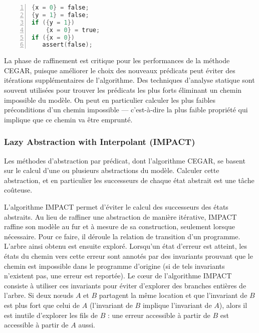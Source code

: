 \begin{minipage}{.45\textwidth}
\begin{lstlisting}[language=C, label=lst:CEGAR_3, numbers=left, frame=single,
  caption=Second raffinement, xleftmargin=1.6em]
{x = 0} = false;
{y = 1} = false;
if ({y = 1})
    {x = 0} = true;
if ({x = 0})
   assert(false);
\end{lstlisting}
\end{minipage}

La phase de raffinement est critique pour les performances de la méthode
\ac{CEGAR}, puisque améliorer le choix des nouveaux prédicats peut éviter des
itérations supplémentaires de l'algorithme. Des techniques d'analyse statique
sont souvent utilisées pour trouver les prédicats les plus forts éliminant un
chemin impossible du modèle. On peut en particulier calculer les plus faibles
préconditions d'un chemin impossible --- c'est-à-dire la plus faible propriété
qui implique que ce chemin va être emprunté.

\subsubsection{Lazy Abstraction with Interpolant (IMPACT)}

Les méthodes d'abstraction par prédicat, dont l'algorithme \ac{CEGAR}, se basent sur
le calcul d'une ou plusieurs abstractions du modèle. Calculer cette abstraction,
et en particulier les successeurs de chaque état abstrait est une tâche
coûteuse.

L'algorithme IMPACT\cite{IMPACT} permet d'éviter le calcul des successeurs des
états abstraits. Au lieu de raffiner une abstraction de manière itérative,
IMPACT raffine son modèle au fur et à mesure de sa construction, seulement
lorsque nécessaire. Pour ce faire, il déroule la relation de transition d'un
programme. L'arbre ainsi obtenu est ensuite exploré. Lorsqu'un état d'erreur
est atteint, les états du chemin vers cette erreur sont annotés par des invariants
prouvant que le chemin est impossible dans le programme d'origine (si de tels
invariants n'existent pas, une erreur est reportée). Le cœur de l'algorithme
IMPACT consiste à utiliser ces invariants pour éviter d'explorer des branches
entières de l'arbre. Si deux nœuds \(A\) et \(B\) partagent la même location et
que l'invariant de \(B\) est plus fort que celui de \(A\) (l'invariant de \(B\)
implique l'invariant de \(A\)), alors il
est inutile d'explorer les fils de \(B\) : une erreur accessible à partir de
\(B\) est accessible à partir de \(A\) aussi.

